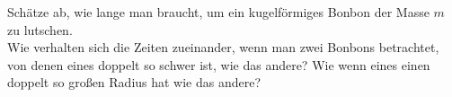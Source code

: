 \begin{Exercise}[label = Bonbon, origin = {4. Runde zur 48. IPhO 2017}, title = Bonbon, difficulty = 2]
Schätze ab, wie lange man braucht, um ein kugelförmiges Bonbon der Masse $m$ zu lutschen.\\
Wie verhalten sich die Zeiten zueinander, wenn man zwei Bonbons betrachtet, von denen eines doppelt so schwer ist, wie das andere? Wie wenn eines einen doppelt so großen Radius hat wie das andere?
\end{Exercise}
